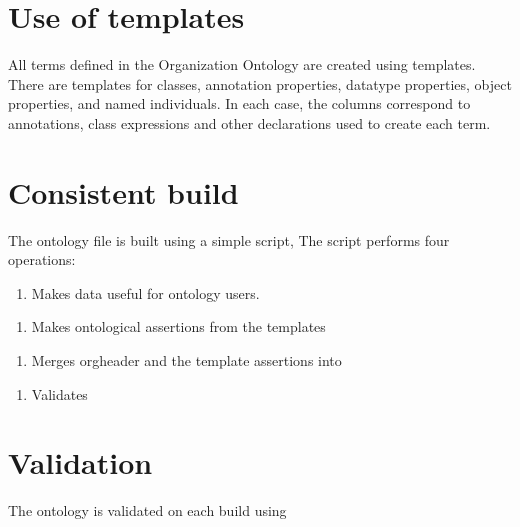 \documentclass[letterpaper,10pt,english]{sphinxmanual}
\begin{document}
\section{Use of templates}
\label{\detokenize{ontology-authors:use-of-templates}}
\sphinxAtStartPar
All terms defined in the Organization Ontology are created using templates.  There are
templates for classes, annotation properties, datatype properties, object properties,
and named individuals.  In each case, the columns correspond to annotations, class
expressions and other declarations used to create each term.


\section{Consistent build}
\label{\detokenize{ontology-authors:consistent-build}}
\sphinxAtStartPar
The ontology file  is built using a simple script,   The script
performs four operations:
\begin{enumerate}
%
\item {} 
\sphinxAtStartPar
Makes data useful for ontology users.

\end{enumerate}
\begin{enumerate}
%
\item {} 
\sphinxAtStartPar
Makes ontological assertions from the templates

\end{enumerate}
\begin{enumerate}
%
\item {} 
\sphinxAtStartPar
Merges org\sphinxhyphen{}header and the template assertions into 

\end{enumerate}
\begin{enumerate}
%
\item {} 
\sphinxAtStartPar
Validates 

\end{enumerate}


\section{Validation}
\label{\detokenize{ontology-authors:validation}}
\sphinxAtStartPar
The ontology is validated on each build using 
\end{document}
